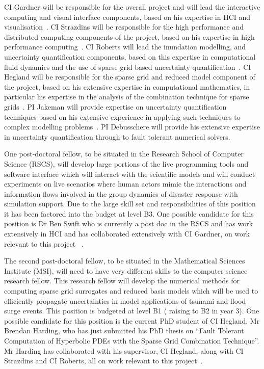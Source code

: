 CI Gardner will be responsible for the overall project and will lead
the interactive computing and visual interface components, based on
his expertise in HCI and visualisation~\parencite{martin2016intelligent,martin2015tracking,swift2014coding,swift2013visual,sorensen2010programming,swiftLive2016}.  
CI Strazdins will be
responsible for the high performance and distributed computing
components of the project, based on his expertise in high performance
computing~\parencite{AliEtal2015,StrazdinsEtal2015,Ali11022016}.  
CI Roberts will lead the inundation modelling, and
uncertainty quantification components, based on this expertise in
computational fluid dynamics and the use of sparse grid based
uncertainty quantification~\parencite{deBaarRDM2015,JakemanRoberts2013,anugamanual,nielsen2005hydrodynamic}.  
CI Hegland will be responsible for the
sparse grid and reduced model component of the project, based on his
extensive expertise in computational mathematics, in particular his
expertise in the analysis of the combination technique for sparse
grids~\parencite{AliEtal2015,HardingHLS2015,Ali11022016}. 
PI Jakeman will provide expertise on uncertainty
quantification techniques based on his extensive experience in
applying such techniques to complex modelling 
problems~\parencite{JakemanRoberts2013,jakemanNumerical2010,Jakeman2015}.  
PI Debusschere will provide his extensive expertise in uncertainty
quantification through to fault tolerant numerical solvers.

One post-doctoral fellow, to be situated in the
Research School of Computer Science (RSCS), will develop large
portions of the live programming tools and software interface which
will interact with the scientific models and will conduct experiments
on live scenarios where human actors mimic the interactions and
information flows involved in the group dynamics of disaster response
with simulation support. Due to the large skill set and responsibilities of 
this position it has been factored into the budget at level B3.
One possible candidate for this position is 
Dr Ben Swift who is currently a post doc in the RSCS and has work 
extensively in HCI and has collaborated extensively with CI Gardner, on work 
relevant to this project ~\parencite{martin2015tracking,martin2016intelligent,swiftLive2016,
swift2013visual,swift2014coding}.

The second post-doctoral fellow, to be
situated in the Mathematical Sciences Institute (MSI), 
will need to have very different skills to the computer 
science research fellow. This research fellow will develop
the numerical methods for computing sparse grid surrogates and reduced
basis models which will be used to efficiently propagate 
uncertainties in
model applications of tsunami and flood surge events. This 
position is budgeted at level B1 ( raising to B2 in year 3).
One possible candidate for this position is the current PhD 
student of CI Hegland, Mr Brendan Harding,  who has just 
submitted his PhD thesis on ``Fault Tolerant Computation of
Hyperbolic PDEs with the Sparse Grid Combination Technique''.
Mr Harding has collaborated with his supervisor, 
CI Hegland, along with CI Strazdins and CI Roberts, all
on work relevant to this project~\parencite{Ali11022016,AliEtal2015,deBaarHarding2015,
HardingHLS2015,StrazdinsEtal2015}.


